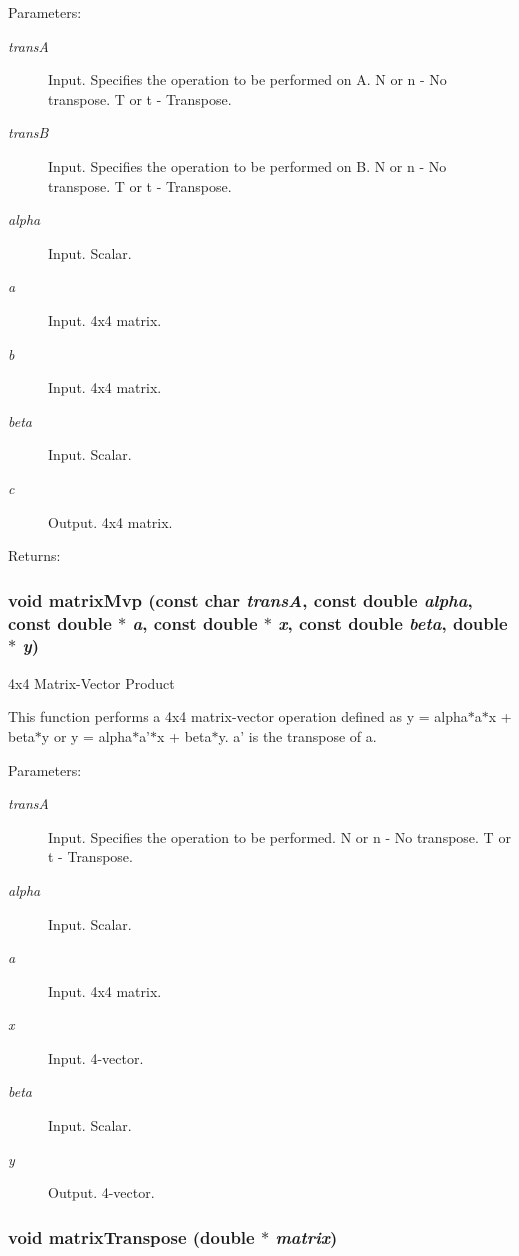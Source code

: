 \begin{Desc}
\item[Parameters:]
\begin{description}
\item[{\em transA}]Input. Specifies the operation to be performed on A. N or n - No transpose. T or t - Transpose. \item[{\em transB}]Input. Specifies the operation to be performed on B. N or n - No transpose. T or t - Transpose. \item[{\em alpha}]Input. Scalar. \item[{\em a}]Input. 4x4 matrix. \item[{\em b}]Input. 4x4 matrix. \item[{\em beta}]Input. Scalar. \item[{\em c}]Output. 4x4 matrix.\end{description}
\end{Desc}
\begin{Desc}
\item[Returns:]\end{Desc}
\hypertarget{group__a_g097b52024b56996c79e5c8767afd66ae}{
\subsubsection[matrixMvp]{\setlength{\rightskip}{0pt plus 5cm}void matrixMvp (const char {\em transA}, \/  const double {\em alpha}, \/  const double $\ast$ {\em a}, \/  const double $\ast$ {\em x}, \/  const double {\em beta}, \/  double $\ast$ {\em y})}}
\label{group__a_g097b52024b56996c79e5c8767afd66ae}


4x4 Matrix-Vector Product 

This function performs a 4x4 matrix-vector operation defined as y = alpha$\ast$a$\ast$x + beta$\ast$y or y = alpha$\ast$a'$\ast$x + beta$\ast$y. a' is the transpose of a.

\begin{Desc}
\item[Parameters:]
\begin{description}
\item[{\em transA}]Input. Specifies the operation to be performed. N or n - No transpose. T or t - Transpose. \item[{\em alpha}]Input. Scalar. \item[{\em a}]Input. 4x4 matrix. \item[{\em x}]Input. 4-vector. \item[{\em beta}]Input. Scalar. \item[{\em y}]Output. 4-vector. \end{description}
\end{Desc}
\hypertarget{group__a_g39674801055355a4eb3338ba6023b83c}{
\subsubsection[matrixTranspose]{\setlength{\rightskip}{0pt plus 5cm}void matrixTranspose (double $\ast$ {\em matrix})}}
\label{group__a_g39674801055355a4eb3338ba6023b83c}


